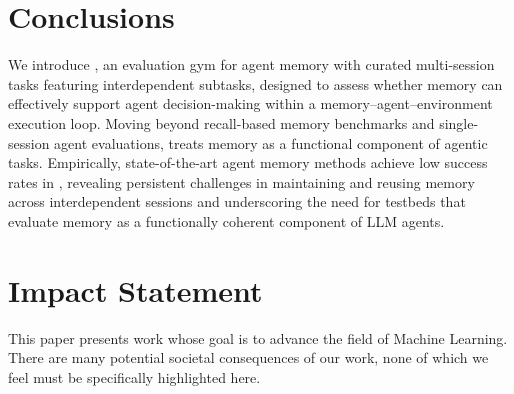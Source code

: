 \section{Conclusions}
We introduce \ours, an evaluation gym for agent memory with curated multi-session tasks featuring interdependent subtasks, designed to assess whether memory can effectively support agent decision-making within a memory–agent–environment execution loop. Moving beyond recall-based memory benchmarks and single-session agent evaluations, \ours treats memory as a functional component of agentic tasks. Empirically, state-of-the-art agent memory methods achieve low success rates in \ours, revealing persistent challenges in maintaining and reusing memory across interdependent sessions and underscoring the need for testbeds that evaluate memory as a functionally coherent component of LLM agents.

\section*{Impact Statement}

This paper presents work whose goal is to advance the field of Machine
Learning. There are many potential societal consequences of our work, none of
which we feel must be specifically highlighted here.


\nocite{langley00}

